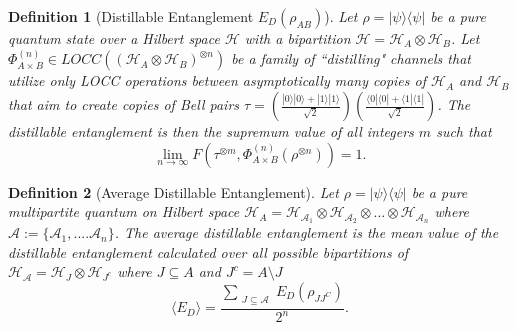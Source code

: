 \documentclass{article}
\newtheorem{definition}{Definition}
\newcommand{\ket}[1]{|#1\rangle}
\newcommand{\bra}[1]{\langle #1|}
\newcommand{\ketbra}[2]{| #1\rangle\! \langle #2|}
\begin{document}
\begin{definition} [Distillable Entanglement $E_D(\rho_{AB})$]
Let $\rho = \ketbra{\psi}{\psi}$ be a pure quantum state over a Hilbert space $\mathcal{H}$ with a bipartition $\mathcal{H} = \mathcal{H}_A \otimes \mathcal{H}_B$. Let $\Phi_{A \times B}^{(n)} \in LOCC((\mathcal{H}_A \otimes \mathcal{H}_B)^{\otimes n})$ be a family of ``distilling" channels that utilize only LOCC operations between asymptotically many copies of $\mathcal{H}_A$ and $\mathcal{H}_B$ that aim to create copies of Bell pairs $\tau = \left(\frac{\ket{0}\ket{0} + \ket{1}\ket{1}}{\sqrt{2}} \right) \left(\frac{\bra{0}\bra{0} + \bra{1}\bra{1}}{\sqrt{2}} \right)$. The \emph{distillable entanglement} is then the supremum value of all integers $m$ such that 
$$
\lim_{n \to \infty} F\left( \tau^{\otimes m}, \Phi_{A \times B}^{(n)} (\rho^{\otimes n}) \right) = 1.
$$

\end{definition}
\begin{definition} [Average Distillable Entanglement]
    Let $\rho = \ketbra{\psi}{\psi}$ be a pure multipartite quantum on Hilbert space $\mathcal{H}_A = \mathcal{H}_{\mathcal{A}_1} \otimes \mathcal{H}_{\mathcal{A}_2} \otimes \dots \otimes \mathcal{H}_{\mathcal{A}_n}$  where $\mathcal{A} := \{\mathcal{A}_1, .... \mathcal{A}_n\}$. The average distillable entanglement is the mean value of the distillable entanglement calculated over all possible bipartitions of $\mathcal{H_A} = \mathcal{H}_J \otimes \mathcal{H}_{J^c}$ where $J \subseteq A$ and $J^c = A \setminus J$
    $$
     \langle E_D \rangle = \frac{\sum_{\substack{J \subseteq \mathcal{A}} }E_D(\rho_{J J^{C}})}{2^n}.
    $$
\end{definition}
\end{document}
